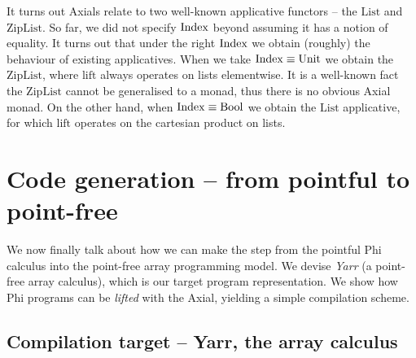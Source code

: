 It turns out Axials relate to two well-known applicative functors -- the $\mathrm{List}$ and $\mathrm{ZipList}$. 
So far, we did not specify $\mathrm{Index}$ beyond assuming it has a notion of equality. 
It turns out that under the right $\mathrm{Index}$ we obtain (roughly) the behaviour of existing applicatives.
When we take $\mathrm{Index} \equiv \mathrm{Unit}$ we obtain the $\mathrm{ZipList}$, where $\mathrm{lift}$ always operates on lists elementwise.
It is a well-known fact the $\mathrm{ZipList}$ cannot be generalised to a monad, thus there is no obvious Axial monad.
On the other hand, when $\mathrm{Index} \equiv \mathrm{Bool}$ we obtain the $\mathrm{List}$ applicative, for which $\mathrm{lift}$ operates on the cartesian product on lists. 

\section{Code generation -- from pointful to point-free}
\label{codegen}

We now finally talk about how we can make the step from the pointful Phi calculus into the point-free array programming model. 
We devise \textit{Yarr} (a point-free array calculus), which is our target program representation. 
We show how Phi programs can be \textit{lifted} with the Axial, yielding a simple compilation scheme.

\subsection{Compilation target -- Yarr, the array calculus}
\label{yarr}

